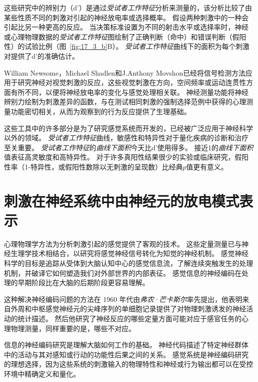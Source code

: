 \begin{proposition}
	\quad \quad 这些研究中的辨别力（d'）是通过\textit{受试者工作特征}分析来测量的，该分析比较了由某些性质不同的刺激对引起的神经放电率或选择概率。
	假设两种刺激中的一种会引起比另一种更高的反应。
	当决策标准设置为不同的射击水平或选择率时，神经或心理物理数据的\textit{受试者工作特征}图绘制了正确判断（命中）和错误判断（假阳性）的试验比例（图~\ref{fig:17_3_b}B）。
	\textit{受试者工作特征}曲线下的面积为每个刺激对提供了d'的准确估计。
	
	\quad \quad William Newsome，Michael Shadlen和J.Anthony Movshon已经将信号检测方法应用于研究神经对视觉刺激的反应，这些视觉刺激在方向，空间频率或运动连贯性方面有所不同，以便将神经放电率的变化与感觉处理相关联。
	神经测量功能将神经辨别力绘制为刺激差异的函数，与在测试相同刺激的强制选择范例中获得的心理测量功能密切相关，从而为观察到的行为反应提供了生理基础。
	
	\quad \quad 这些工具中的许多部分是为了研究感觉系统而开发的，已经被广泛应用于神经科学以外的领域。
	\textit{受试者工作特征}曲线，敏感性和特异性对于量化疾病的诊断和治疗至关重要。
	\textit{受试者工作特征}的\textit{曲线下面积}今天比d'使用得多。
	接近1的\textit{曲线下面积}值表征高灵敏度和高特异性。
	对于许多真阳性结果很少的实验或临床研究，假阳性率（1-特异性，或假阳性数除以无刺激的呈现数）比经典$ p $值更有意义。
	
\end{proposition}



\section{刺激在神经系统中由神经元的放电模式表示}
心理物理学方法为分析刺激引起的感觉提供了客观的技术。 
这些定量测量已与神经生理学技术相结合，以研究将感觉神经信号转化为知觉的神经机制。 
感觉神经科学的目标是追踪从受体到大脑认知中心的感觉信息流，了解连续突触发生的处理机制，并破译它如何塑造我们对外部世界的内部表征。 
感觉信息的神经编码在处理的早期阶段比在大脑的后期阶段更容易理解。


这种解决神经编码问题的方法在 1960 年代由\textit{弗农·芒卡斯尔}率先提出，他表明来自外周和中枢感觉神经元的尖峰序列的单细胞记录提供了对物理刺激诱发的神经活动的统计描述。
然后他研究了神经反应的哪些定量方面可能对应于感官任务的心理物理测量，同样重要的是，哪些不对应。


信息的神经编码研究是理解大脑如何工作的基础。
神经代码描述了特定神经群体中的活动与其对感知或行动的功能性后果之间的关系。 
感觉系统是神经编码研究的理想选择，因为这些系统的刺激输入的物理特性和神经或行为输出都可以在受控环境中精确定义和量化。



